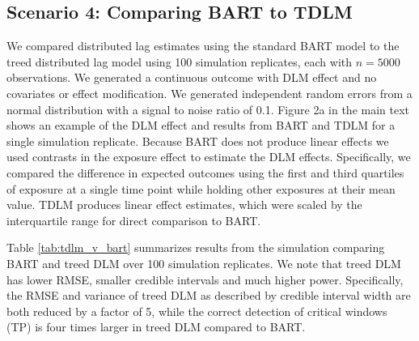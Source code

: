 \documentclass[12pt]{article}
\begin{document}
\subsection{Scenario 4: Comparing BART to TDLM}
We compared distributed lag estimates using the standard BART model to the treed distributed lag model using 100 simulation replicates, each with $n=5000$ observations. We generated a continuous outcome with DLM effect and no covariates or effect modification. We generated independent random errors from a normal distribution with a signal to noise ratio of 0.1. Figure 2a in the main text shows an example of the DLM effect and results from BART and TDLM for a single simulation replicate. Because BART does not produce linear effects we used contrasts in the exposure effect to estimate the DLM effects. Specifically, we compared the difference in expected outcomes using the first and third quartiles of exposure at a single time point while holding other exposures at their mean value. TDLM produces linear effect estimates, which were scaled by the interquartile range for direct comparison to BART.

Table \ref{tab:tdlm_v_bart} summarizes results from the simulation comparing BART and treed DLM over 100 simulation replicates. We note that treed DLM has lower RMSE, smaller credible intervals and much higher power. Specifically, the RMSE and variance of treed DLM as described by credible interval width are both reduced by a factor of 5, while the correct detection of critical windows (TP) is four times larger in treed DLM compared to BART.

\end{document}
